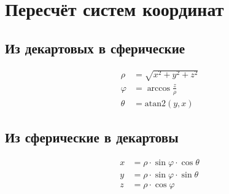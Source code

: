 \documentclass[a4paper]{article}
\theoremstyle{hangindent}
\theoremstyle{hangindent}
\newcommand\atanT[2]{\mbox{atan2}\left(#1, #2\right)}
\begin{document}
\section{Пересчёт систем координат}
\subsection{Из декартовых в сферические}
\begin{align}
    \rho    & = \sqrt{x^2 + y^2 + z^2} \\
    \varphi & = \arccos{\frac{z}{\rho}} \\
    \theta  & = \atanT{y}{x}
\end{align}

\subsection{Из сферические в декартовы}
\begin{align}
    x &= \rho \cdot \sin{\varphi} \cdot \cos{\theta} \\
    y &= \rho \cdot \sin{\varphi} \cdot \sin{\theta} \\
    z &= \rho \cdot \cos{\varphi}
\end{align}
\end{document}
